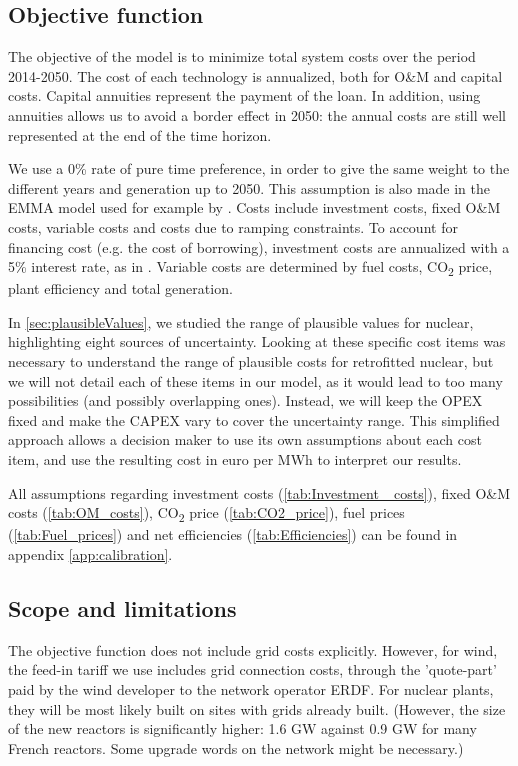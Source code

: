 \subsection{Objective function}

The objective of the model is to minimize total system costs over the period 2014-2050.
The cost of each technology is annualized, both for O\&M and capital costs. 
Capital annuities represent the payment of the loan. 
In addition, using annuities allows us to avoid a border effect in 2050: the annual costs are still well represented at the end of the time horizon.

We use a 0\% rate of pure time preference, in order to give the same weight to the different years and generation up to 2050. This assumption is also made in the EMMA model \citep{EMMA} used for example by \citet{Hirth2016}.
Costs include investment costs, fixed O\&M costs, variable costs and costs due to ramping constraints.
To account for financing cost (e.g. the cost of borrowing), investment costs are annualized with a 5\% interest rate, as in \citet{Jagemann2013}.
Variable costs are determined by fuel costs, CO\textsubscript{2} price, plant efficiency and total generation.

In \ref{sec:plausibleValues}, we studied the range of plausible values for nuclear, highlighting eight sources of uncertainty. Looking at these specific cost items was necessary to understand the range of plausible costs for retrofitted nuclear, but we will not detail each of these items in our model, as it would lead to too many possibilities (and possibly overlapping ones). Instead, we will keep the OPEX fixed and make the CAPEX vary to cover the uncertainty range. This simplified approach allows a decision maker to use its own assumptions about each cost item, and use the resulting cost in euro per MWh to interpret our results.

All assumptions regarding investment costs (\cref{tab:Investment _costs}), fixed O\&M costs (\cref{tab:OM_costs}), CO\textsubscript{2} price (\cref{tab:CO2_price}), fuel prices (\cref{tab:Fuel_prices}) and net efficiencies (\cref{tab:Efficiencies}) can be found in appendix \ref{app:calibration}.

\subsection{Scope and limitations}

The objective function does not include grid costs explicitly.
However, for wind, the feed-in tariff we use includes grid connection costs, through the 'quote-part' paid by the wind developer to the network operator ERDF.
For nuclear plants, they will be most likely built on sites with grids already built. (However, the size of the new reactors is significantly higher: 1.6 GW against 0.9 GW for many French reactors. Some upgrade words on the network might be necessary.)

